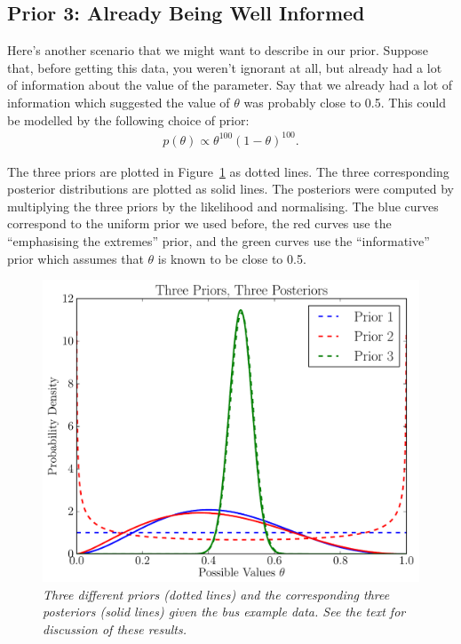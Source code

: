 \subsection{Prior 3: Already Being Well Informed}
Here's another scenario that we might want to describe in our prior.
Suppose that, before getting this data, you weren't ignorant at all, but already
had a lot of information about the value of the parameter. Say that we already had a lot of information which
suggested the value of $\theta$ was probably close to 0.5. This could be modelled
by the following choice of prior:
\begin{eqnarray}
p(\theta) \propto \theta^{100}(1 - \theta)^{100}.\label{eq:prior3}
\end{eqnarray}

The three priors are plotted in Figure~\ref{fig:three_priors} as dotted lines.
The three corresponding posterior distributions are plotted as solid lines.
The posteriors were computed by multiplying the three priors by the likelihood
and normalising.
The blue curves correspond to the uniform prior we used before, the red
curves use the ``emphasising the extremes'' prior, and the green curves use the
``informative'' prior which assumes that $\theta$ is known to be close to 0.5.

\begin{figure}[h!]
\begin{center}
\includegraphics[scale=0.6]{Figures/three_priors.pdf}
\caption{\it Three different priors (dotted lines) and the corresponding
three posteriors (solid lines) given the bus example data. See the text
for discussion of these results.\label{fig:three_priors}}
\end{center}
\end{figure}


